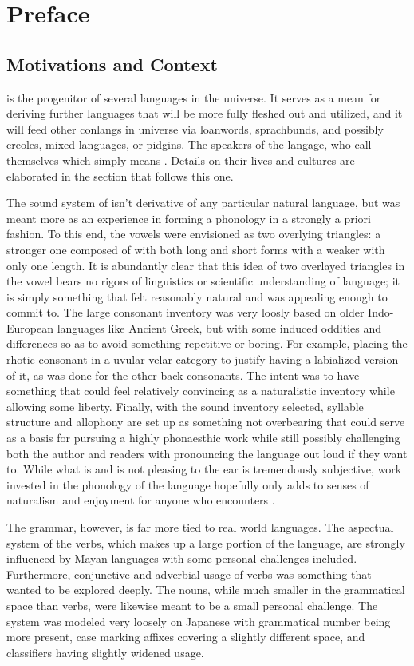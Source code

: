 \section{Preface}
\subsection{Motivations and Context}
  \langname is the progenitor of several languages in the \worldname\space universe. It serves as a mean for deriving further languages that will be more fully fleshed out and utilized, and it will feed other conlangs in universe via loanwords, sprachbunds, and possibly creoles, mixed languages, or pidgins. The speakers of the langage, who call themselves  which simply means . Details on their lives and cultures are elaborated in the section that follows this one.\par
  The sound system of \langname isn't derivative of any particular natural language, but was meant more as an experience in forming a phonology in a strongly a priori fashion. To this end, the vowels were envisioned as two overlying triangles: a stronger one composed of  with both long and short forms with a weaker \phonemic{\tshorty, \tshorte, \tshorto} with only one length. It is abundantly clear that this idea of two overlayed triangles in the vowel bears no rigors of linguistics or scientific understanding of language; it is simply something that felt reasonably natural and was appealing enough to commit to. The large consonant inventory was very loosly based on older Indo-European languages like Ancient Greek, but with some induced oddities and differences so as to avoid something repetitive or boring. For example, placing the rhotic consonant in a uvular-velar category to justify having a labialized version of it, as was done for the other back consonants. The intent was to have something that could feel relatively convincing as a naturalistic inventory while allowing some liberty. Finally, with the sound inventory selected, syllable structure and allophony are set up as something not overbearing that could serve as a basis for pursuing a highly phonaesthic work while still possibly challenging both the author and readers with pronouncing the language out loud if they want to. While what is and is not pleasing to the ear is tremendously subjective, work invested in the phonology of the language hopefully only adds to senses of naturalism and enjoyment for anyone who encounters \langname.\par
  The grammar, however, is far more tied to real world languages. The aspectual system of the verbs, which makes up a large portion of the language, are strongly influenced by Mayan languages with some personal challenges included. Furthermore, conjunctive and adverbial usage of verbs was something that wanted to be explored deeply. The nouns, while much smaller in the grammatical space than verbs, were likewise meant to be a small personal challenge. The system was modeled very loosely on Japanese with grammatical number being more present, case marking affixes covering a slightly different space, and classifiers having slightly widened usage.\par

